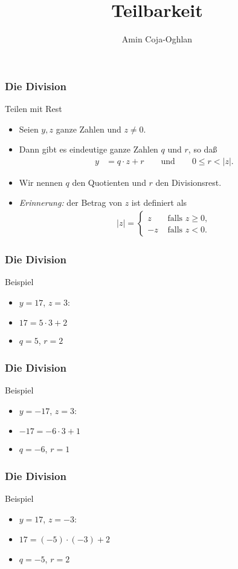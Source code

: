 \documentclass{beamer}
\title[Linadi]{Teilbarkeit}
\author[Amin Coja-Oghlan]{Amin Coja-Oghlan}
\institute[Frankfurt]{JWGUFFM}
\date{}
\renewcommand{\emph}[1]{{\textcolor{solarizedRed}{\itshape #1}}}
\begin{document}
\frame[plain]{\titlepage}

\begin{frame}\frametitle{Die Division}
	\begin{block}{Teilen mit Rest}
		\begin{itemize}
			\item Seien $y,z$ ganze Zahlen und $z\neq0$.
			\item Dann gibt es eindeutige ganze Zahlen $q$ und $r$, so da\ss
				\begin{align*}
					y&=q\cdot z+r\qquad\mbox{und}\qquad 0\leq r<|z|.
				\end{align*}
			\item Wir nennen $q$ den \alert{Quotienten} und $r$ den \alert{Divisionsrest}.
			\item \emph{Erinnerung:} der \alert{Betrag} von $z$ ist definiert als
				\begin{align*}
					|z|=\begin{cases}z&\mbox{ falls }z\geq0,\\-z&\mbox{ falls }z<0. \end{cases}
				\end{align*}
		\end{itemize}
	\end{block}
\end{frame}

\begin{frame}\frametitle{Die Division}
	\begin{block}{Beispiel}
		\begin{itemize}
			\item $y=17$, $z=3$:
			\item	$17=5\cdot 3+2$
			\item $q=5$, $r=2$
		\end{itemize}
	\end{block}
\end{frame}

\begin{frame}\frametitle{Die Division}
	\begin{block}{Beispiel}
		\begin{itemize}
			\item $y=-17$, $z=3$:
			\item	$-17=-6\cdot 3+1$
			\item $q=-6$, $r=1$
		\end{itemize}
	\end{block}
\end{frame}

\begin{frame}\frametitle{Die Division}
	\begin{block}{Beispiel}
		\begin{itemize}
			\item $y=17$, $z=-3$:
			\item	$17=(-5)\cdot(-3)+2$
			\item $q=-5$, $r=2$
		\end{itemize}
	\end{block}
\end{frame}
\end{document}

